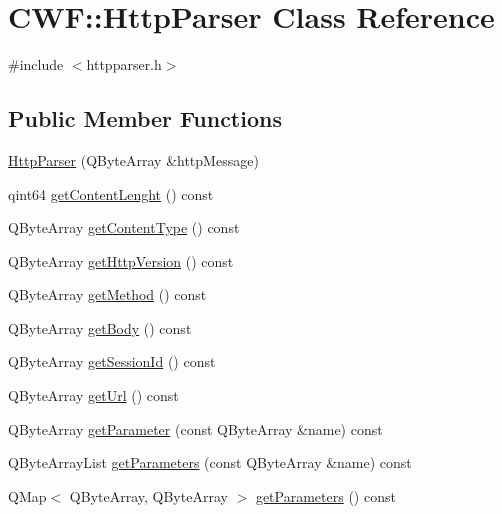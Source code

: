 \hypertarget{class_c_w_f_1_1_http_parser}{\section{C\+W\+F\+:\+:Http\+Parser Class Reference}
\label{class_c_w_f_1_1_http_parser}
}


{\ttfamily \#include $<$httpparser.\+h$>$}

\subsection*{Public Member Functions}
\begin{DoxyCompactItemize}
\item 
\hyperlink{class_c_w_f_1_1_http_parser_a622e35e9c7de9a29cfe3a2cf63eccef0}{Http\+Parser} (Q\+Byte\+Array \&http\+Message)
\item 
qint64 \hyperlink{class_c_w_f_1_1_http_parser_af6b66138a1afe71e15640d4108d426fc}{get\+Content\+Lenght} () const 
\item 
Q\+Byte\+Array \hyperlink{class_c_w_f_1_1_http_parser_ae25e55945b9b364a20c9f5d3a8696f15}{get\+Content\+Type} () const 
\item 
Q\+Byte\+Array \hyperlink{class_c_w_f_1_1_http_parser_af8ceae98ad9e63dd30c56409438f4131}{get\+Http\+Version} () const 
\item 
Q\+Byte\+Array \hyperlink{class_c_w_f_1_1_http_parser_aef9dffb5672f9db22cf2a590dc641706}{get\+Method} () const 
\item 
Q\+Byte\+Array \hyperlink{class_c_w_f_1_1_http_parser_a4c3be05ffe5ca08abf2e244e08d3de37}{get\+Body} () const 
\item 
Q\+Byte\+Array \hyperlink{class_c_w_f_1_1_http_parser_a6067d805528a11425f4b58f81218c17f}{get\+Session\+Id} () const 
\item 
Q\+Byte\+Array \hyperlink{class_c_w_f_1_1_http_parser_ab6e2249f05ad5a7a25ace2e36066e57b}{get\+Url} () const 
\item 
Q\+Byte\+Array \hyperlink{class_c_w_f_1_1_http_parser_acc4042b879ad71e4c1b82bfb78033a92}{get\+Parameter} (const Q\+Byte\+Array \&name) const 
\item 
Q\+Byte\+Array\+List \hyperlink{class_c_w_f_1_1_http_parser_a0ff9ecad7dd6a5e419e59d7eb0516ee7}{get\+Parameters} (const Q\+Byte\+Array \&name) const 
\item 
Q\+Map$<$ Q\+Byte\+Array, Q\+Byte\+Array $>$ \hyperlink{class_c_w_f_1_1_http_parser_a3991b21e344eac5e60da64a2c1959702}{get\+Parameters} () const 

\end{DoxyCompactItemize}
